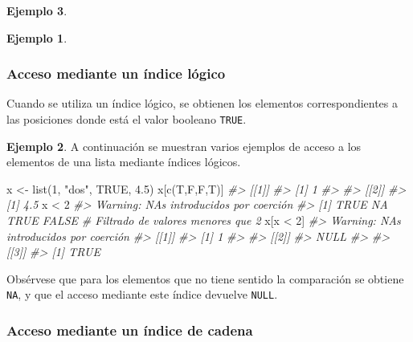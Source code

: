 \documentclass[
]{book}
\newenvironment{Shaded}{\begin{snugshade}}{\end{snugshade}}
\newcommand{\CommentTok}[1]{\textcolor[rgb]{0.56,0.35,0.01}{\textit{#1}}}
\newcommand{\ConstantTok}[1]{\textcolor[rgb]{0.00,0.00,0.00}{#1}}
\newcommand{\DecValTok}[1]{\textcolor[rgb]{0.00,0.00,0.81}{#1}}
\newcommand{\FloatTok}[1]{\textcolor[rgb]{0.00,0.00,0.81}{#1}}
\newcommand{\FunctionTok}[1]{\textcolor[rgb]{0.00,0.00,0.00}{#1}}
\newcommand{\NormalTok}[1]{#1}
\newcommand{\OtherTok}[1]{\textcolor[rgb]{0.56,0.35,0.01}{#1}}
\newcommand{\SpecialCharTok}[1]{\textcolor[rgb]{0.00,0.00,0.00}{#1}}
\newcommand{\StringTok}[1]{\textcolor[rgb]{0.31,0.60,0.02}{#1}}
\theoremstyle{definition}
\theoremstyle{definition}
\newtheorem{example}{Ejemplo}[chapter]
\theoremstyle{definition}
\theoremstyle{definition}
\theoremstyle{remark}
\begin{document}
\begin{example}
\begin{example}
\end{example}

\hypertarget{acceso-mediante-un-uxedndice-luxf3gico-1}{%
\subsubsection{Acceso mediante un índice lógico}\label{acceso-mediante-un-uxedndice-luxf3gico-1}}

Cuando se utiliza un índice lógico, se obtienen los elementos correspondientes a las posiciones donde está el valor booleano \texttt{TRUE}.

\begin{example}
A continuación se muestran varios ejemplos de acceso a los elementos de una lista mediante índices lógicos.

\begin{Shaded}
\begin{Highlighting}[]
\NormalTok{x }\OtherTok{\textless{}{-}} \FunctionTok{list}\NormalTok{(}\DecValTok{1}\NormalTok{, }\StringTok{"dos"}\NormalTok{, }\ConstantTok{TRUE}\NormalTok{, }\FloatTok{4.5}\NormalTok{)}
\NormalTok{x[}\FunctionTok{c}\NormalTok{(T,F,F,T)]}
\CommentTok{\#\textgreater{} [[1]]}
\CommentTok{\#\textgreater{} [1] 1}
\CommentTok{\#\textgreater{} }
\CommentTok{\#\textgreater{} [[2]]}
\CommentTok{\#\textgreater{} [1] 4.5}
\NormalTok{x }\SpecialCharTok{\textless{}} \DecValTok{2}
\CommentTok{\#\textgreater{} Warning: NAs introducidos por coerción}
\CommentTok{\#\textgreater{} [1]  TRUE    NA  TRUE FALSE}
\CommentTok{\# Filtrado de valores menores que 2}
\NormalTok{x[x }\SpecialCharTok{\textless{}} \DecValTok{2}\NormalTok{]}
\CommentTok{\#\textgreater{} Warning: NAs introducidos por coerción}
\CommentTok{\#\textgreater{} [[1]]}
\CommentTok{\#\textgreater{} [1] 1}
\CommentTok{\#\textgreater{} }
\CommentTok{\#\textgreater{} [[2]]}
\CommentTok{\#\textgreater{} NULL}
\CommentTok{\#\textgreater{} }
\CommentTok{\#\textgreater{} [[3]]}
\CommentTok{\#\textgreater{} [1] TRUE}
\end{Highlighting}
\end{Shaded}

Obsérvese que para los elementos que no tiene sentido la comparación se obtiene \texttt{NA}, y que el acceso mediante este índice devuelve \texttt{NULL}.
\end{example}

\hypertarget{acceso-mediante-un-uxedndice-de-cadena-1}{%
\subsubsection{Acceso mediante un índice de cadena}\label{acceso-mediante-un-uxedndice-de-cadena-1}}


\end{example}
\end{document}
